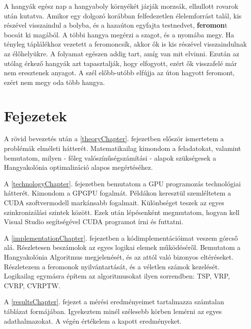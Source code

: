 A hangyák egész nap a hangyaboly környékét járják morzsák, elhullott rovarok után kutatva. Amikor egy dolgozó korábban felfedezetlen élelemforrást talál, kis részével visszaindul a bolyba, és a hazaúton egyfajta testnedvet, \textbf{feromon}t bocsát ki magából. A többi hangya megérzi a szagot, és a nyomába megy. Ha tényleg táplálékhoz vezetett a feromoncsík, akkor ők is kis részével visszaindulnak az élőhelyükre. A folyamat egészen addig tart, amíg van mit elvinni. Ezután az utólag érkező hangyák azt tapasztalják, hogy elfogyott, ezért ők visszafelé már nem eresztenek anyagot. A szél előbb-utóbb elfújja az úton hagyott feromont, ezért nem megy oda több hangya.

\section{Fejezetek}
A rövid bevezetés után a \ref{theoryChapter}. fejezetben először ismertetem a problémák elméleti hátterét. Matematikailag kimondom a feladatokat, valamint bemutatom, milyen - főleg valószínűségszámítási - alapok szükségesek a Hangyakolónia optimalizáció alapos megértéséhez.

A \ref{technologyChapter}. fejezetben bemutatom a GPU programozás technológiai hátterét. Kimondom a GPGPU fogalmát. Példákon keresztül szemléltetem a CUDA szoftvermodell markánsabb fogalmait. Különbséget teszek az egyes szinkronizálási szintek között. Ezek után lépésenként megmutatom, hogyan kell Visual Studio segítségével CUDA programot írni és futtatni.

A \ref{implementationChapter}. fejezetben a kódimplementációimat veszem górcső alá. Részletesen beszámolok az egyes logikai elemek működéséről. Bemutatom a Hangyakolónia Algoritmus megjelenését, és az attól való bizonyos eltéréseket. Részletezem a feromonok nyilvántartását, és a véletlen számok kezelését. Logikailag egymásra építem az algoritmusokat ilyen sorrendben: TSP, VRP, CVRP, CVRPTW.

A \ref{resultsChapter}. fejezet a mérési eredményeimet tartalmazza számtalan táblázat formájában. Igyekeztem minél szélesebb körben lemérni az egyes adathalmazokat. A végén értékelem a kapott eredményeket. 





